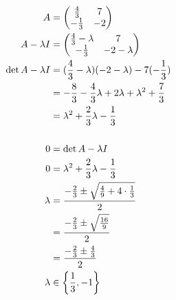

\begin{align*}
  A &= 
      \begin{pmatrix}
        \frac{4}{3} & 7 \\
        -\frac{1}{3} & -2 \\
      \end{pmatrix}\\
  A-\lambda I &=
      \begin{pmatrix}
        \frac{4}{3}-\lambda & 7 \\
        -\frac{1}{3} & -2-\lambda \\
      \end{pmatrix}\\
  \det{A-\lambda I } &= (\frac{4}{3}-\lambda)(-2-\lambda) -7(-\frac{1}{3})\\
    &= -\frac{8}{3}-\frac{4}{3}\lambda+2\lambda+\lambda^2 +\frac{7}{3}\\
    &= \lambda^2+ \frac{2}{3}\lambda-\frac{1}{3}\\
  \\
  0 &= \det{A-\lambda I} \\
  0 &= \lambda^2+ \frac{2}{3}\lambda-\frac{1}{3}\\
  \lambda &= \frac{-\frac{2}{3} \pm \sqrt{\frac{4}{9}+4\cdot\frac{1}{3}}}{2}\\
    &= \frac{-\frac{2}{3} \pm \sqrt{\frac{16}{9}}}{2}\\
    &= \frac{-\frac{2}{3} \pm \frac{4}{3}}{2}\\
    \lambda &\in \left\{ \frac{1}{3}, -1 \right \}\\
\end{align*}


